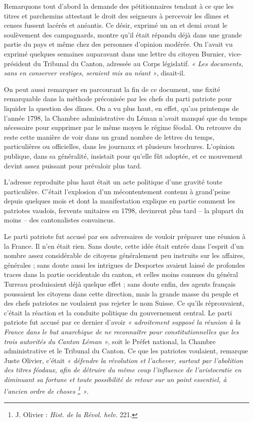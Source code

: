 \documentclass[french,twoside]{book} %
\begin{document}
\noindent Remarquons tout d’abord la demande des pétitionnaires tendant à ce que les titres et parchemins attestant le droit des seigneurs à percevoir les dîmes et censes fussent lacérés et anéantis. Ce désir, exprimé un an et demi avant le soulèvement des campagnards, montre qu’il était répandu déjà dans une grande partie du pays et même chez des personnes d’opinion modérée. On l’avait vu exprimé quelques semaines auparavant dans une lettre du citoyen Burnier, vice-président du Tribunal du Canton, adressée au Corps législatif. \emph{« Les documents, sans en conserver vestiges, seraient mis au néant »}, disait-il.\par
On peut aussi remarquer en parcourant la fin de ce document, une fixité remarquable dans la méthode préconisée par les chefs du parti patriote pour liquider la question des dîmes. On a vu plus haut, en effet, qu’au printemps de l’année 1798, la Chambre administrative du Léman n’avait manqué que du temps nécessaire pour supprimer par le même moyen le régime féodal. On retrouve du reste cette manière de voir dans un grand nombre de lettres du temps, particulières ou officielles, dans les journaux et plusieurs brochures. L’opinion publique, dans sa généralité, insistait pour qu’elle fût adoptée, et ce mouvement devint assez puissant pour prévaloir plus tard.\par
L’adresse reproduite plus haut était un acte politique d’une gravité toute particulière. C’était l’explosion d’un mécontentement contenu à grand’peine depuis quelques mois et dont la manifestation explique en partie comment les patriotes vaudois, fervents unitaires en 1798, devinrent plus tard – la plupart du moins – des cantonalistes convaincus.\par
Le parti patriote fut accusé par ses adversaires de vouloir préparer une réunion à la France. Il n’en était rien. Sans doute, cette idée était entrée dans l’esprit d’un nombre assez considérable de citoyens généralement peu instruits sur les affaires, générales ; sans doute aussi les intrigues de Desportes avaient laissé de profondes traces dans la partie occidentale du canton, et celles moins connues du général Turreau produisaient déjà quelque effet ; sans doute enfin, des agents français poussaient les citoyens dans cette direction, mais la grande masse du peuple et des chefs patriotes ne voulaient pas rejeter le nom Suisse. Ce qu’ils réprouvaient, c’était la réaction et la conduite politique du gouvernement central. Le parti patriote fut accusé par ce dernier d’avoir \emph{« adroitement supposé la réunion à la France dans le but anarchique de ne reconnaître pour constitutionnelles que les trois autorités du Canton Léman »}, soit le Préfet national, la Chambre administrative et le Tribunal du Canton. Ce que les patriotes voulaient, remarque Juste Olivier, c’était \emph{« défendre la révolution et l’achever, surtout par l’abolition des titres féodaux, afin de détruire du même coup l’influence de l’aristocratie en diminuant sa fortune et toute possibilité de retour sur un point essentiel, à l’ancien ordre de choses \footnote{J. Olivier : \emph{Hist. de la Révol. helv.} 221.} »}.\par
\end{document}

